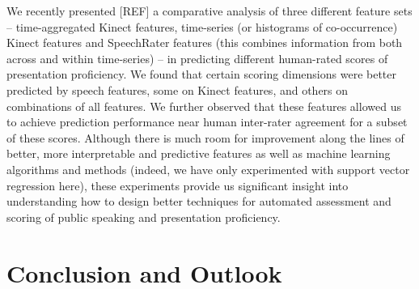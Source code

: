 \documentclass{article} %
\begin{document}
We recently presented [REF] a comparative analysis of three different feature sets -- time-aggregated Kinect features, time-series (or histograms of co-occurrence) Kinect features and SpeechRater features (this combines information from both across and within time-series) -- in predicting different human-rated scores of presentation proficiency. We found that certain scoring dimensions were better predicted by speech features, some on Kinect features, and others on combinations of all features. We further observed that these features allowed us to achieve prediction performance near human inter-rater agreement for a subset of these scores. Although there is much room for improvement along the lines of better, more interpretable and predictive features as well as machine learning algorithms and methods (indeed, we have only experimented with support vector regression here), these experiments provide us significant insight into understanding how to design better techniques for automated assessment and scoring of public speaking and presentation proficiency. 


\section{Conclusion and Outlook}






\end{document}

